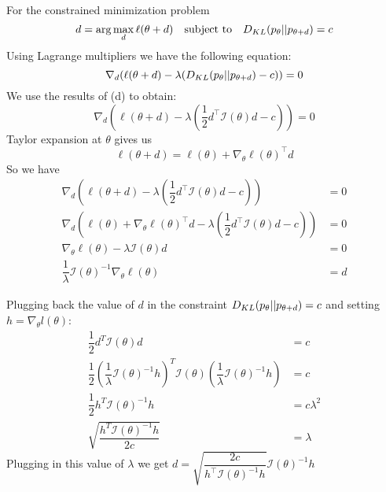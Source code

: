 \begin{answer}
For the constrained minimization problem
$$
d=\arg\max_d \ell(\theta+d)
\quad \text{subject to} \quad
D_{KL}(p_{\theta}||p_{\theta+d}) = c
$$
Using Lagrange multipliers we have the following equation:
$$
\nabla_d(\ell(\theta+d) - \lambda(D_{KL}(p_{\theta}||p_{\theta+d})-c)) = 0
$$
We use the results of (d) to obtain:
$$
\nabla_d \left( \ell(\theta+d)-\lambda \left( \dfrac{1}{2}d^\top \mathcal{I}(\theta)d-c \right)\right) = 0
$$
Taylor expansion at $\theta$ gives us
$$
\ell(\theta+d) = \ell(\theta)+\nabla_\theta \ell(\theta)^\top d
$$
So we have
\begin{align*}
    \nabla_d \left(\ell(\theta+d)-\lambda\left(\dfrac{1}{2}d^\top\mathcal{I}(\theta)d-c \right)\right) &= 0 \\
    \nabla_d \left(\ell(\theta)+\nabla_\theta \ell(\theta)^\top d-\lambda\left(\dfrac{1}{2}d^\top \mathcal{I}(\theta)d-c \right)\right) &= 0 \\
    \nabla_\theta\ell(\theta)-\lambda \mathcal{I}(\theta)d &= 0 \\
    \dfrac{1}{\lambda}\mathcal{I}(\theta)^{-1}\nabla_\theta\ell(\theta) &= d
\end{align*}

Plugging back the value of $d$ in the constraint $D_{KL}(p_{\theta}||p_{\theta+d})=c$ and setting $h=\nabla_{\theta}l(\theta)$:
\begin{align*}
    \dfrac{1}{2}d^T\mathcal{I}(\theta)d &= c \\
    \dfrac{1}{2}\left(\dfrac{1}{\lambda}\mathcal{I}(\theta)^{-1}h \right)^T\mathcal{I}(\theta)\left(\dfrac{1}{\lambda}\mathcal{I}(\theta)^{-1}h\right) &= c \\
    \dfrac{1}{2}h^T\mathcal{I}(\theta)^{-1}h &= c\lambda^2 \\
    \sqrt{\dfrac{h^T\mathcal{I}(\theta)^{-1}h}{2c}} &= \lambda
\end{align*}
Plugging in this value of $\lambda$ we get $d = \sqrt{\dfrac{2c}{h^\top\mathcal{I}(\theta)^{-1}h}}\mathcal{I}(\theta)^{-1}h$
\end{answer}
